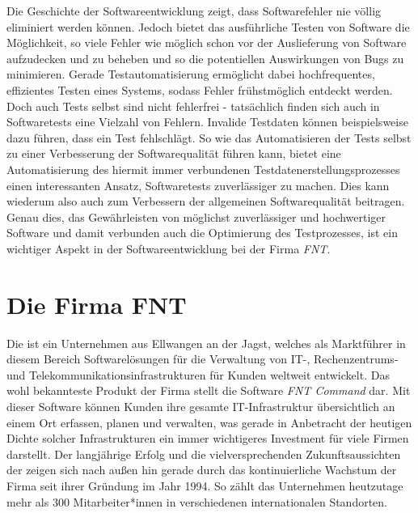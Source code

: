 Die Geschichte der Softwareentwicklung zeigt, dass Softwarefehler nie völlig eliminiert werden können. Jedoch bietet das ausführliche Testen von Software die Möglichkeit, so viele Fehler wie möglich schon vor der Auslieferung von Software aufzudecken und zu beheben und so die potentiellen Auswirkungen von Bugs zu minimieren. Gerade Testautomatisierung ermöglicht dabei hochfrequentes, effizientes Testen eines Systems, sodass Fehler frühstmöglich entdeckt werden. Doch auch Tests selbst sind nicht fehlerfrei - tatsächlich finden sich auch in Softwaretests eine Vielzahl von Fehlern. \cite{vahabzadeh:2015} Invalide Testdaten können beispielsweise dazu führen, dass ein Test fehlschlägt. So wie das Automatisieren der Tests selbst zu einer Verbesserung der Softwarequalität führen kann, bietet eine Automatisierung des hiermit immer verbundenen Testdatenerstellungsprozesses einen interessanten Ansatz, Softwaretests zuverlässiger zu machen. Dies kann wiederum also auch zum Verbessern der allgemeinen Softwarequalität beitragen. Genau dies, das Gewährleisten von möglichst zuverlässiger und hochwertiger Software und damit verbunden auch die Optimierung des Testprozesses, ist ein wichtiger Aspekt in der Softwareentwicklung bei der Firma \textit{FNT}. 

\section{Die Firma FNT}\label{sec:fnt}
Die \textit{\companyName{}} ist ein Unternehmen aus Ellwangen an der Jagst, welches als Marktführer in diesem Bereich Softwarelösungen für die Verwaltung von IT-, Rechenzentrums- und Telekommunikationsinfrastrukturen für Kunden weltweit entwickelt. \cite{fnt:2021} Das wohl bekannteste Produkt der Firma stellt die Software \textit{FNT Command} dar. Mit dieser Software können Kunden ihre gesamte IT-Infrastruktur übersichtlich an einem Ort erfassen, planen und verwalten, was gerade in Anbetracht der heutigen Dichte solcher Infrastrukturen ein immer wichtigeres Investment für viele Firmen darstellt. Der langjährige Erfolg und die vielversprechenden Zukunftsaussichten der \textit{\companyName{}} zeigen sich nach außen hin gerade durch das kontinuierliche Wachstum der Firma seit ihrer Gründung im Jahr 1994. So zählt das Unternehmen heutzutage mehr als 300 Mitarbeiter*innen in verschiedenen internationalen Standorten.

